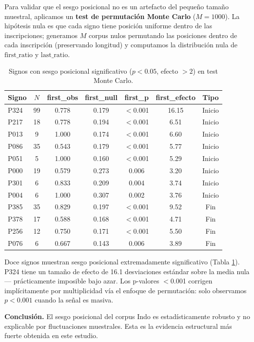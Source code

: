 \documentclass[11pt,a4paper]{article}
\newcommand{\1}{\mathbf{1}}
\numberwithin{equation}{section}
\begin{document}
Para validar que el sesgo posicional no es un artefacto del pequeño tamaño muestral, aplicamos un \textbf{test de permutación Monte Carlo} ($M=1000$). La hipótesis nula es que cada signo tiene posición uniforme dentro de las inscripciones; generamos $M$ corpus nulos permutando las posiciones dentro de cada inscripción (preservando longitud) y computamos la distribución nula de $\text{first\_ratio}$ y $\text{last\_ratio}$.

\begin{table}[h]
\centering
\caption{Signos con sesgo posicional significativo ($p<0.05$, efecto $>2$) en test Monte Carlo.}
\label{tab:montecarlo}
\begin{tabular}{lcccccc}
\toprule
Signo & $N$ & first\_obs & first\_null & first\_p & first\_efecto & Tipo \\
\midrule
P324 & 99 & 0.778 & 0.179 & $<$0.001 & 16.15 & Inicio \\
P217 & 18 & 0.778 & 0.194 & $<$0.001 & 6.51 & Inicio \\
P013 & 9 & 1.000 & 0.174 & $<$0.001 & 6.60 & Inicio \\
P086 & 35 & 0.543 & 0.179 & $<$0.001 & 5.77 & Inicio \\
P051 & 5 & 1.000 & 0.160 & $<$0.001 & 5.29 & Inicio \\
P000 & 19 & 0.579 & 0.273 & 0.006 & 3.20 & Inicio \\
P301 & 6 & 0.833 & 0.209 & 0.004 & 3.74 & Inicio \\
P004 & 6 & 1.000 & 0.307 & 0.002 & 3.76 & Inicio \\
\midrule
P385 & 35 & 0.829 & 0.197 & $<$0.001 & 9.52 & Fin \\
P378 & 17 & 0.588 & 0.168 & $<$0.001 & 4.71 & Fin \\
P256 & 12 & 0.750 & 0.171 & $<$0.001 & 5.50 & Fin \\
P076 & 6 & 0.667 & 0.143 & 0.006 & 3.89 & Fin \\
\bottomrule
\end{tabular}
\end{table}

Doce signos muestran sesgo posicional extremadamente significativo (Tabla \ref{tab:montecarlo}). P324 tiene un tamaño de efecto de 16.1 desviaciones estándar sobre la media nula --- prácticamente imposible bajo azar. Los p-valores $<$0.001 corrigen implícitamente por multiplicidad vía el enfoque de permutación: solo observamos $p<0.001$ cuando la señal es masiva.

\textbf{Conclusión.} El sesgo posicional del corpus Indo es estadísticamente robusto y no explicable por fluctuaciones muestrales. Esta es la evidencia estructural más fuerte obtenida en este estudio.
\end{document}
